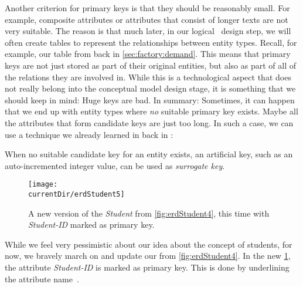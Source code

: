 Another criterion for primary keys is that they should be reasonably small.
For example, composite attributes or attributes that consist of longer texts are not very suitable.
The reason is that much later, in our logical \db\ design step, we will often create tables to represent the relationships between entity types.
Recall, for example, our  table from back in \cref{sec:factory:demand}.
This means that primary keys are not just stored as part of their original entities, but also as part of all of the relations they are involved in.
While this is a technological aspect that does not really belong into the conceptual model design stage, it is something that we should keep in mind:
Huge keys are bad.
In summary:%
%
%
%
Sometimes, it can happen that we end up with entity types where \emph{no} suitable primary key exists.
Maybe all the attributes that form candidate keys are just too long.
In such a case, we can use a technique we already learned in back in :%
%
\begin{definition}%
\label{def:surrogateKey}%
When no suitable candidate key for an entity exists, an artificial key, such as an auto-incremented integer value, can be used as \emph{surrogate key}.%
\end{definition}%
\begin{figure}%
%
\centering%
\texttt{[image: \\currentDir/erdStudent5]}%
\caption{A new version of the \emph{Student}  from \cref{fig:erdStudent4}, this time with \emph{Student-ID} marked as primary key.}%
\label{fig:erdStudent5}%
\end{figure}%
%
While we feel very pessimistic about our idea about the concept of students, for now, we bravely march on and update our  from \cref{fig:erdStudent4}.
In the new \cref{fig:erdStudent5}, the attribute \emph{Student-ID} is marked as primary key.
This is done by underlining the attribute name~\cite{G2011EW2ITDS:CMUTERM}.%
%
\FloatBarrier%
\endhsection%
%
